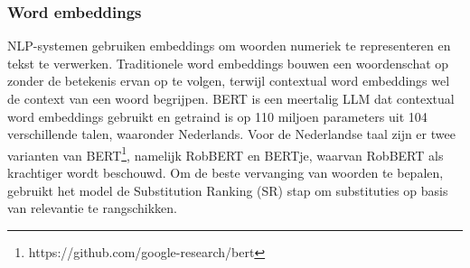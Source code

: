 \subsubsection{Word embeddings}

NLP-systemen gebruiken embeddings om woorden numeriek te representeren en tekst te verwerken. Traditionele word embeddings bouwen een woordenschat op zonder de betekenis ervan op te volgen, terwijl contextual word embeddings wel de context van een woord begrijpen. BERT is een meertalig LLM dat contextual word embeddings gebruikt en getraind is op 110 miljoen parameters uit 104 verschillende talen, waaronder Nederlands. Voor de Nederlandse taal zijn er twee varianten van BERT\footnote{https://github.com/google-research/bert}, namelijk RobBERT en BERTje, waarvan RobBERT als krachtiger wordt beschouwd. Om de beste vervanging van woorden te bepalen, gebruikt het model de Substitution Ranking (SR) stap om substituties op basis van relevantie te rangschikken. %



